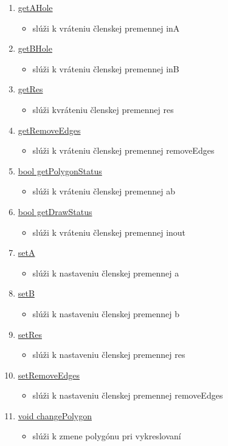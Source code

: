 \documentclass[12pt]{article}
\begin{document}
\begin{enumerate}
\item[] \underline{getAHole}
\begin{itemize}
\item slúži k vráteniu členskej premennej inA
\end{itemize}

\item[] \underline{getBHole}
\begin{itemize}
\item slúži k vráteniu členskej premennej inB
\end{itemize}

\item[] \underline{getRes}
\begin{itemize}
\item slúži kvráteniu členskej premennej res
\end{itemize}

\item[] \underline{getRemoveEdges}
\begin{itemize}
\item slúži k vráteniu členskej premennej removeEdges
\end{itemize}

\item[] \underline{bool getPolygonStatus}
\begin{itemize}
\item slúži k vráteniu členskej premennej ab
\end{itemize}

\item[] \underline{bool getDrawStatus}
\begin{itemize}
\item slúži k vráteniu členskej premennej inout
\end{itemize}

\item[] \underline{setA}
\begin{itemize}
\item slúži k nastaveniu členskej premennej a
\end{itemize}
\item[] \underline{setB}
\begin{itemize}
\item slúži k nastaveniu členskej premennej b
\end{itemize}
\item[] \underline{setRes}
\begin{itemize}
\item slúži k nastaveniu členskej premennej res
\end{itemize}
\item[] \underline{setRemoveEdges}
\begin{itemize}
\item slúži k nastaveniu členskej premennej removeEdges
\end{itemize}
\item[] \underline{void changePolygon}
\begin{itemize}
\item slúži k zmene polygónu pri vykreslovaní
\end{itemize}
\end{enumerate}
\end{document}
